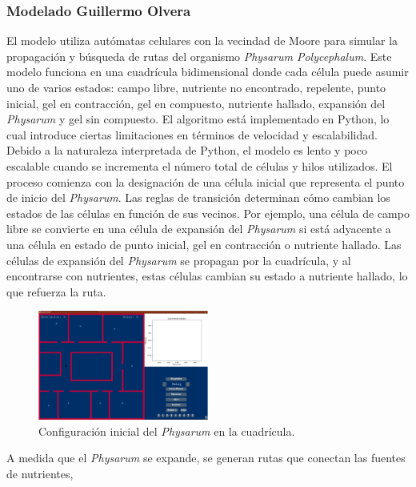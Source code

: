 \subsubsection{Modelado Guillermo Olvera} %
\label{ssub:ModeladoGuillermoOlvera}
    El modelo utiliza aut\'omatas celulares con la vecindad de Moore para simular la propagaci\'on y b\'usqueda de rutas del organismo 
        \textit{Physarum Polycephalum}. Este modelo funciona en una cuadr\'icula bidimensional donde cada c\'elula puede asumir 
        uno de varios estados: campo libre, nutriente no encontrado, repelente, punto inicial, gel en contracci\'on, 
        gel en compuesto, nutriente hallado, expansi\'on del \textit{Physarum} y gel sin compuesto.
    \vskip 0.5cm
    El algoritmo est\'a implementado en Python, lo cual introduce ciertas limitaciones en t\'erminos de 
        velocidad y escalabilidad. Debido a la naturaleza interpretada de Python, el modelo es lento 
        y poco escalable cuando se incrementa el n\'umero total de c\'elulas y hilos utilizados.
    \vskip 0.5cm
    El proceso comienza con la designaci\'on de una c\'elula inicial que representa el punto de inicio del \textit{Physarum}. 
        Las reglas de transici\'on determinan c\'omo cambian los estados de las c\'elulas en funci\'on de sus vecinos. Por ejemplo, 
        una c\'elula de campo libre se convierte en una c\'elula de expansi\'on del \textit{Physarum} si est\'a adyacente a una 
        c\'elula en estado de punto inicial, gel en contracci\'on o nutriente hallado. Las c\'elulas de expansi\'on del \textit{Physarum} 
        se propagan por la cuadr\'icula, y al encontrarse con nutrientes, estas c\'elulas cambian su estado a nutriente hallado, 
        lo que refuerza la ruta.
    \vskip 0.5cm
    \begin{figure}[h]
        \centering
        \includegraphics[width=0.5\textwidth]{./images/estado_del_arte/physarum/estadoInicialOlvera.png}
        \caption{Configuraci\'on inicial del \textit{Physarum} en la cuadr\'icula.}
        \label{fig:initial_state}
    \end{figure}
    \vskip 0.5cm
    A medida que el \textit{Physarum} se expande, se generan rutas que conectan las fuentes de nutrientes, 
